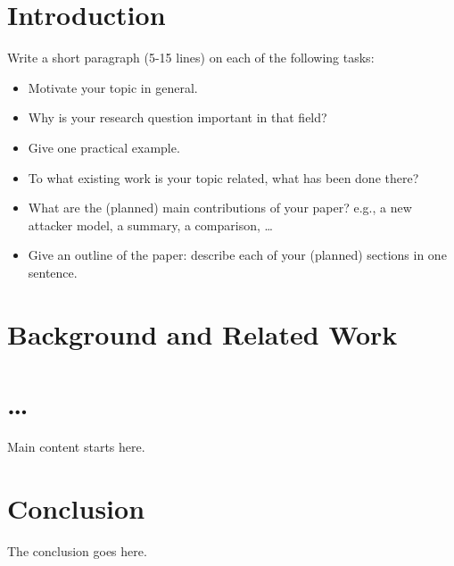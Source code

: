 \documentclass[sigconf]{acmart}
\begin{document}
%
%





\maketitle

\section{Introduction}

Write a short paragraph (5-15 lines) on each of the following tasks:
\begin{itemize}
\item Motivate your topic in general.
\item Why is your research question important in that field?
\item Give one practical example.
\item To what existing work is your topic related, what has been done there?
\item What are the (planned) main contributions of your paper? e.g., a
new attacker model, a summary, a comparison, \dots
\item Give an outline of the paper: describe each of your (planned)
sections in one sentence.
\end{itemize}


\section{Background and Related Work}

\section{\dots}

Main content starts here. \nocite{*}


\section{Conclusion}
The conclusion goes here.



 
\end{document}
